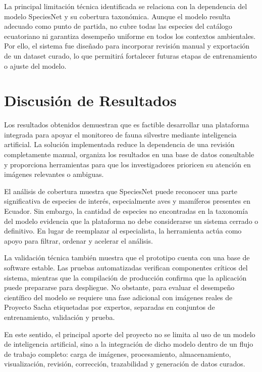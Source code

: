 La principal limitación técnica identificada se relaciona con la dependencia del modelo SpeciesNet y su cobertura taxonómica. Aunque el modelo resulta adecuado como punto de partida, no cubre todas las especies del catálogo ecuatoriano ni garantiza desempeño uniforme en todos los contextos ambientales. Por ello, el sistema fue diseñado para incorporar revisión manual y exportación de un dataset curado, lo que permitirá fortalecer futuras etapas de entrenamiento o ajuste del modelo.

\section{Discusión de Resultados}
\label{sec:discusion_resultados}

Los resultados obtenidos demuestran que es factible desarrollar una plataforma integrada para apoyar el monitoreo de fauna silvestre mediante inteligencia artificial. La solución implementada reduce la dependencia de una revisión completamente manual, organiza los resultados en una base de datos consultable y proporciona herramientas para que los investigadores prioricen su atención en imágenes relevantes o ambiguas.

El análisis de cobertura muestra que SpeciesNet puede reconocer una parte significativa de especies de interés, especialmente aves y mamíferos presentes en Ecuador. Sin embargo, la cantidad de especies no encontradas en la taxonomía del modelo evidencia que la plataforma no debe considerarse un sistema cerrado o definitivo. En lugar de reemplazar al especialista, la herramienta actúa como apoyo para filtrar, ordenar y acelerar el análisis.

La validación técnica también muestra que el prototipo cuenta con una base de software estable. Las pruebas automatizadas verifican componentes críticos del sistema, mientras que la compilación de producción confirma que la aplicación puede prepararse para despliegue. No obstante, para evaluar el desempeño científico del modelo se requiere una fase adicional con imágenes reales de Proyecto Sacha etiquetadas por expertos, separadas en conjuntos de entrenamiento, validación y prueba.

En este sentido, el principal aporte del proyecto no se limita al uso de un modelo de inteligencia artificial, sino a la integración de dicho modelo dentro de un flujo de trabajo completo: carga de imágenes, procesamiento, almacenamiento, visualización, revisión, corrección, trazabilidad y generación de datos curados.

